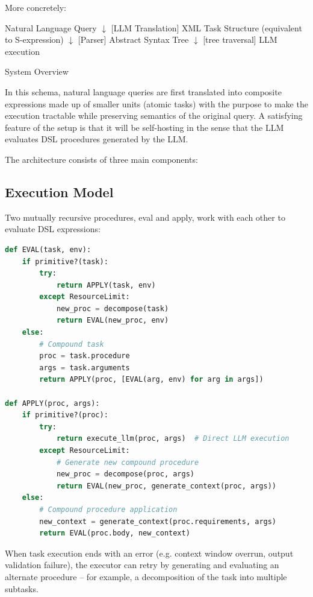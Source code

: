 \documentclass{article}
\begin{document}
More concretely:

\begin{algorithm}[H]
\SetAlgoLined
{}
Natural Language Query\;
$\downarrow$ [LLM Translation]\;
XML Task Structure (equivalent to S-expression)\;
$\downarrow$ [Parser]\;
Abstract Syntax Tree\;
$\downarrow$ [tree traversal]\;
LLM execution\;
\caption{System Overview}
\end{algorithm}

In this schema, natural language queries are first translated into composite expressions made up of smaller units (atomic tasks) with the purpose to make the execution tractable while preserving semantics of the original query. A satisfying feature of the setup is that it will be self-hosting in the sense that the LLM evaluates DSL procedures generated by the LLM.

The architecture consists of three main components:

\subsection{Execution Model}
Two mutually recursive procedures, eval and apply, work with each other to evaluate DSL expressions:

\begin{lstlisting}[language=Python, caption=Core Evaluation Functions]
def EVAL(task, env):
    if primitive?(task):
        try:
            return APPLY(task, env)
        except ResourceLimit:
            new_proc = decompose(task)
            return EVAL(new_proc, env)
    else:
        # Compound task
        proc = task.procedure
        args = task.arguments
        return APPLY(proc, [EVAL(arg, env) for arg in args])

def APPLY(proc, args):
    if primitive?(proc):
        try:
            return execute_llm(proc, args)  # Direct LLM execution
        except ResourceLimit:
            # Generate new compound procedure
            new_proc = decompose(proc, args)
            return EVAL(new_proc, generate_context(proc, args))
    else:
        # Compound procedure application
        new_context = generate_context(proc.requirements, args)
        return EVAL(proc.body, new_context)
\end{lstlisting}

When task execution ends with an error (e.g. context window overrun, output validation failure), the executor can retry by generating and evaluating an alternate procedure -- for example, a decomposition of the task into multiple subtasks.
\end{document}

